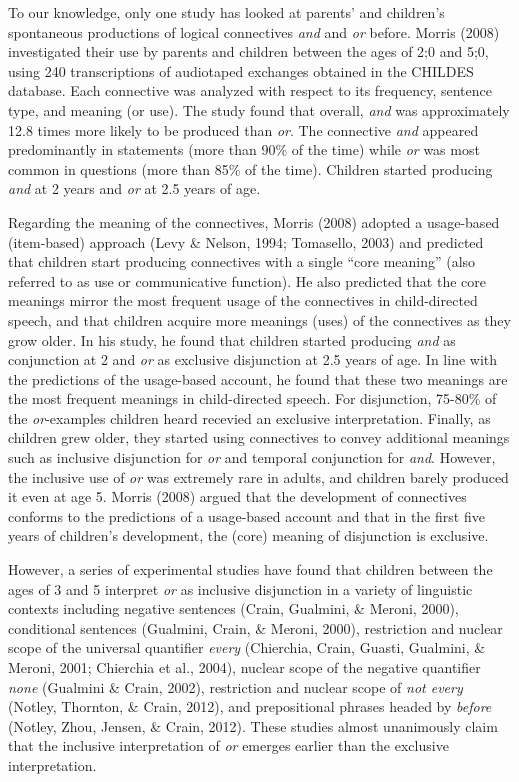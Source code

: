 \documentclass[floatsintext,man]{apa6}
\theoremstyle{definition}
\theoremstyle{definition}
\theoremstyle{definition}
\theoremstyle{remark}
\begin{document}
To our knowledge, only one study has looked at parents' and children's
spontaneous productions of logical connectives \emph{and} and \emph{or}
before. Morris (2008) investigated their use by parents and children
between the ages of 2;0 and 5;0, using 240 transcriptions of audiotaped
exchanges obtained in the CHILDES database. Each connective was analyzed
with respect to its frequency, sentence type, and meaning (or use). The
study found that overall, \emph{and} was approximately 12.8 times more
likely to be produced than \emph{or}. The connective \emph{and} appeared
predominantly in statements (more than 90\% of the time) while \emph{or}
was most common in questions (more than 85\% of the time). Children
started producing \emph{and} at 2 years and \emph{or} at 2.5 years of
age.

Regarding the meaning of the connectives, Morris (2008) adopted a
usage-based (item-based) approach (Levy \& Nelson, 1994; Tomasello,
2003) and predicted that children start producing connectives with a
single \enquote{core meaning} (also referred to as use or communicative
function). He also predicted that the core meanings mirror the most
frequent usage of the connectives in child-directed speech, and that
children acquire more meanings (uses) of the connectives as they grow
older. In his study, he found that children started producing \emph{and}
as conjunction at 2 and \emph{or} as exclusive disjunction at 2.5 years
of age. In line with the predictions of the usage-based account, he
found that these two meanings are the most frequent meanings in
child-directed speech. For disjunction, 75-80\% of the
\emph{or}-examples children heard recevied an exclusive interpretation.
Finally, as children grew older, they started using connectives to
convey additional meanings such as inclusive disjunction for \emph{or}
and temporal conjunction for \emph{and}. However, the inclusive use of
\emph{or} was extremely rare in adults, and children barely produced it
even at age 5. Morris (2008) argued that the development of connectives
conforms to the predictions of a usage-based account and that in the
first five years of children's development, the (core) meaning of
disjunction is exclusive.

However, a series of experimental studies have found that children
between the ages of 3 and 5 interpret \emph{or} as inclusive disjunction
in a variety of linguistic contexts including negative sentences (Crain,
Gualmini, \& Meroni, 2000), conditional sentences (Gualmini, Crain, \&
Meroni, 2000), restriction and nuclear scope of the universal quantifier
\emph{every} (Chierchia, Crain, Guasti, Gualmini, \& Meroni, 2001;
Chierchia et al., 2004), nuclear scope of the negative quantifier
\emph{none} (Gualmini \& Crain, 2002), restriction and nuclear scope of
\emph{not every} (Notley, Thornton, \& Crain, 2012), and prepositional
phrases headed by \emph{before} (Notley, Zhou, Jensen, \& Crain, 2012).
These studies almost unanimously claim that the inclusive interpretation
of \emph{or} emerges earlier than the exclusive interpretation.
\end{document}
